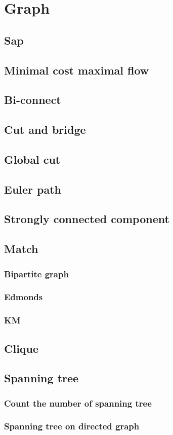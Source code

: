\section{Graph}
\subsection{Sap}

\subsection{Minimal cost maximal flow}

\subsection{Bi-connect}

\subsection{Cut and bridge}

\subsection{Global cut}

\subsection{Euler path}

\subsection{Strongly connected component}


\subsection{Match}
\subsubsection{Bipartite graph}

\subsubsection{Edmonds}

\subsubsection{KM}


\subsection{Clique}


\subsection{Spanning tree}
\subsubsection{Count the number of spanning tree}

\subsubsection{Spanning tree on directed graph}


